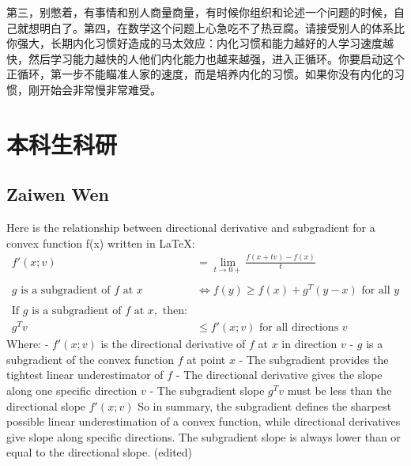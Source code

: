 \documentclass[12pt, a4paper, oneside]{ctexart}
\begin{document}
第三，别憋着，有事情和别人商量商量，有时候你组织和论述一个问题的时候，自己就想明白了。第四，在数学这个问题上心急吃不了热豆腐。请接受别人的体系比你强大，长期内化习惯好造成的马太效应：内化习惯和能力越好的人学习速度越快，然后学习能力越快的人他们内化能力也越来越强，进入正循环。你要启动这个正循环，第一步不能瞄准人家的速度，而是培养内化的习惯。如果你没有内化的习惯，刚开始会非常慢非常难受。

\section{本科生科研}

\subsection{Zaiwen Wen}
Here is the relationship between directional derivative and subgradient for a convex function f(x) written in LaTeX:
\begin{align*}
f'(x;v) &= \lim_{t\to 0+} \frac{f(x+tv) - f(x)}{t} \\
\\
g \text{ is a subgradient of } f \text{ at } x &\Leftrightarrow f(y) \geq f(x) + g^T(y-x) \text{ for all } y
\\ \\
\text{If } g \text{ is a subgradient of } f \text{ at } x, \text{ then:} \\
g^Tv &\leq f'(x;v) \text{ for all directions } v
\end{align*}
Where:
- $f'(x;v)$ is the directional derivative of $f$ at $x$ in direction $v$
- $g$ is a subgradient of the convex function $f$ at point $x$
- The subgradient provides the tightest linear underestimator of $f$
- The directional derivative gives the slope along one specific direction $v$
- The subgradient slope $g^Tv$ must be less than the directional slope $f'(x;v)$
So in summary, the subgradient defines the sharpest possible linear underestimation of a convex function, while directional derivatives give slope along specific directions. The subgradient slope is always lower than or equal to the directional slope. (edited) 
\end{document}
